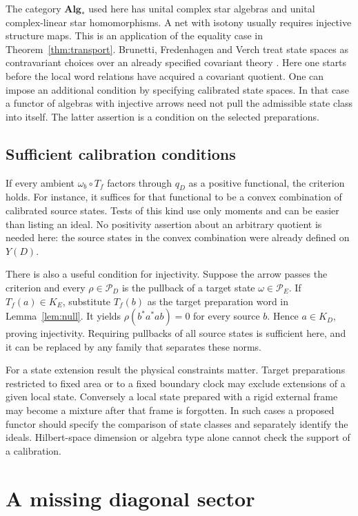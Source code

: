 \documentclass[11pt,letterpaper]{article}
\newcommand{\alg}{\mathbf{Alg}_{*}}
\newcommand{\Probes}{\mathcal P}
\begin{document}
The category $\alg$ used here has unital complex star algebras and unital complex-linear star homomorphisms. A net with isotony usually requires injective structure maps. This is an application of the equality case in Theorem~\ref{thm:transport}. Brunetti, Fredenhagen and Verch treat state spaces as contravariant choices over an already specified covariant theory \cite[Sec.~3.1]{bfv}. Here one starts before the local word relations have acquired a covariant quotient. One can impose an additional condition by specifying calibrated state spaces. In that case a functor of algebras with injective arrows need not pull the admissible state class into itself. The latter assertion is a condition on the selected preparations.

\subsection{Sufficient calibration conditions}

If every ambient $\omega_b\circ T_f$ factors through $q_D$ as a positive functional, the criterion holds. For instance, it suffices for that functional to be a convex combination of calibrated source states. Tests of this kind use only moments and can be easier than listing an ideal. No positivity assertion about an arbitrary quotient is needed here: the source states in the convex combination were already defined on $Y(D)$.

There is also a useful condition for injectivity. Suppose the arrow passes the criterion and every $\rho\in\Probes_D$ is the pullback of a target state $\omega\in\Probes_E$. If $T_f(a)\in K_E$, substitute $T_f(b)$ as the target preparation word in Lemma~\ref{lem:null}. It yields $\rho(b^*a^*ab)=0$ for every source $b$. Hence $a\in K_D$, proving injectivity. Requiring pullbacks of all source states is sufficient here, and it can be replaced by any family that separates these norms.

For a state extension result the physical constraints matter. Target preparations restricted to fixed area or to a fixed boundary clock may exclude extensions of a given local state. Conversely a local state prepared with a rigid external frame may become a mixture after that frame is forgotten. In such cases a proposed functor should specify the comparison of state classes and separately identify the ideals. Hilbert-space dimension or algebra type alone cannot check the support of a calibration.

\section{A missing diagonal sector}
\label{sec:example}
\end{document}
